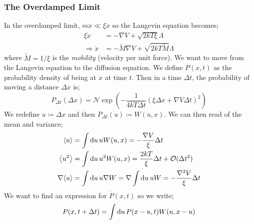 \subsubsection{The Overdamped Limit}
In the overdamped limit, $m\ddot{x} \ll \xi\dot{x}$ so the Langevin equation becomes;
\begin{align*}
\xi \dot{x} &= -\nabla V + \sqrt{2kT\xi}\Lambda \\
\Rightarrow \dot{x} &= -\tilde{M}\nabla V + \sqrt{2kT\tilde{M}}\Lambda
\end{align*}
where $\tilde{M} = 1/\xi$ is the \emph{mobility} (velocity per unit force). We want to move from the Langevin equation to the diffusion equation. We define $P(x, t)$ as the probability density of being at $x$ at time $t$. Then in a time $\Delta t$, the probability of moving a distance $\Delta x$ is;\footnotemark
{}
\begin{equation}
P_{\Delta t}(\Delta x) = \mathcal{N}\exp\left(-\frac{1}{4kT\Delta t}\left(\xi \Delta x + \nabla V \Delta t\right)^2\right)
\end{equation}
We redefine $u \coloneqq \Delta x$ and then $P_{\Delta t}(u) \coloneqq W(u, x)$. We can then read of the mean and variance;
\begin{align}
\left< u \right> &= \int{\upd{u} uW(u, x)} = -\frac{\nabla V}{\xi}\Delta t \\ 
\left< u^2 \right> &= \int{\upd{u}u^2W(u, x)} = \frac{2kT}{\xi}\Delta t + \mO(\Delta t^2) \\
\nabla\left< u \right> &= \int{\upd{u}u\nabla W} = \nabla\int{\upd{u}uW} = -\frac{\nabla^2 V}{\xi}\Delta t
\end{align}
We want to find an expression for $\dot{P}(x, t)$ so we write;
\begin{equation*}
P(x, t + \Delta t) = \int{\text{d}u \,P(x - u, t)W(u, x - u)}
\end{equation*}
